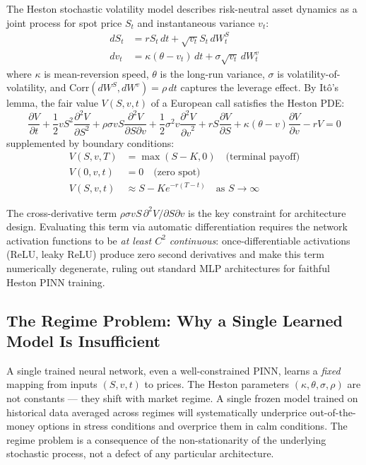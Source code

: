 \documentclass[11pt,a4paper]{article}
\begin{document}
The Heston stochastic volatility model \citep{heston1993closed} describes risk-neutral
asset dynamics as a joint process for spot price $S_t$ and instantaneous variance $v_t$:
\begin{align}
dS_t &= r S_t \, dt + \sqrt{v_t} S_t \, dW_t^S \\
dv_t &= \kappa(\theta - v_t) \, dt + \sigma \sqrt{v_t} \, dW_t^v
\end{align}
where $\kappa$ is mean-reversion speed, $\theta$ is the long-run variance, $\sigma$ is
volatility-of-volatility, and $\text{Corr}(dW^S, dW^v) = \rho \, dt$ captures the
leverage effect. By It\^o's lemma, the fair value $V(S,v,t)$ of a European call
satisfies the Heston PDE:
\begin{equation}
\frac{\partial V}{\partial t}
+ \frac{1}{2}vS^2\frac{\partial^2 V}{\partial S^2}
+ \rho\sigma vS\frac{\partial^2 V}{\partial S\partial v}
+ \frac{1}{2}\sigma^2 v\frac{\partial^2 V}{{\partial v}^2}
+ rS\frac{\partial V}{\partial S}
+ \kappa(\theta-v)\frac{\partial V}{\partial v}
- rV = 0
\label{eq:heston_pde}
\end{equation}
supplemented by boundary conditions:
\begin{align}
V(S, v, T) &= \max(S - K, 0) \quad \text{(terminal payoff)} \label{eq:bc1} \\
V(0, v, t) &= 0 \quad \text{(zero spot)} \label{eq:bc2} \\
V(S, v, t) &\approx S - Ke^{-r(T-t)} \quad \text{as } S \to \infty \label{eq:bc3}
\end{align}

The cross-derivative term $\rho\sigma vS \,\partial^2 V / \partial S \partial v$ is the
key constraint for architecture design. Evaluating this term via automatic
differentiation requires the network activation functions to be \emph{at least $C^2$
continuous}: once-differentiable activations (ReLU, leaky ReLU) produce zero second
derivatives and make this term numerically degenerate, ruling out standard MLP
architectures for faithful Heston PINN training.

\subsection{The Regime Problem: Why a Single Learned Model Is Insufficient}

A single trained neural network, even a well-constrained PINN, learns a \emph{fixed}
mapping from inputs $(S,v,t)$ to prices. The Heston parameters $(\kappa,\theta,\sigma,
\rho)$ are not constants --- they shift with market regime. A single frozen model trained
on historical data averaged across regimes will systematically underprice
out-of-the-money options in stress conditions and overprice them in calm conditions.
The regime problem is a consequence of the non-stationarity of the underlying stochastic
process, not a defect of any particular architecture.
\end{document}
